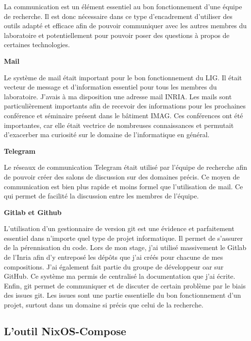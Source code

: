 \documentclass[a4paper,french,12pt, titlepage]{article}
\begin{document}
La communication est un élément essentiel au bon fonctionnement d'une
équipe de recherche. Il est donc nécessaire dans ce type d'encadrement
d'utiliser des outils adapté et efficace afin de pouvoir communiquer
avec les autres membres du laboratoire et potentiellement pour pouvoir
poser des questions à propos de certaines technologies.\newline

\textbf{Mail}\newline

Le système de mail était important pour le bon fonctionnement du LIG. Il
était vecteur de message et d'information essentiel pour tous les
membres du laboratoire. J'avais à ma disposition une adresse mail INRIA.
Les mails sont particulièrement importants afin de recevoir des
informations pour les prochaines conférence et séminaire présent dans le
bâtiment IMAG. Ces conférences ont été importantes, car elle était
vectrice de nombreuses connaissances et permutait d'exacerber ma
curiosité sur le domaine de l'informatique en général.\newline

\textbf{Telegram}\newline

Le réseaux de communication Telegram était utilisé par l'équipe de
recherche afin de pouvoir créer des salons de discussion sur des
domaines précis. Ce moyen de communication est bien plus rapide et moins
formel que l'utilisation de mail. Ce qui permet de facilité la
discussion entre les membres de l'équipe.\newline

\textbf{Gitlab et Github}\newline

L'utilisation d'un gestionnaire de version git est une évidence et
parfaitement essentiel dans n'importe quel type de projet informatique.
Il permet de s'assurer de la pérennisation du code. Lors de mon stage,
j'ai utilisé massivement le Gitlab de l'Inria afin d'y entreposé les
dépôts que j'ai créés pour chacune de mes compositions. J'ai également
fait partie du groupe de développeur oar sur GitHub. Ce système ma
permis de centralisé la documentation que j'ai écrite. Enfin, git permet
de communiquer et de discuter de certain problème par le biais des
issues git. Les issues sont une partie essentielle du bon fonctionnement
d'un projet, surtout dans un domaine si précis que celui de la
recherche.

\newpage

\hypertarget{loutil-nixos-compose}{%
\subsection{L'outil NixOS-Compose}\label{loutil-nixos-compose}}
\end{document}
